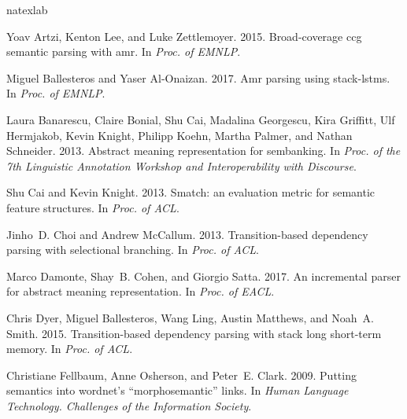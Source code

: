 \documentclass[11pt,a4paper]{article}
\begin{document}

\begin{thebibliography}{30}
	\expandafter\ifx\csname natexlab\endcsname\relax\def\natexlab#1{#1}\fi
	
	Yoav Artzi, Kenton Lee, and Luke Zettlemoyer. 2015.
	\newblock Broad-coverage ccg semantic parsing with amr.
	\newblock In \emph{Proc. of EMNLP}.
	
	Miguel Ballesteros and Yaser Al-Onaizan. 2017.
	\newblock Amr parsing using stack-lstms.
	\newblock In \emph{Proc. of EMNLP}.
	
	Laura Banarescu, Claire Bonial, Shu Cai, Madalina Georgescu, Kira Griffitt, Ulf
	Hermjakob, Kevin Knight, Philipp Koehn, Martha Palmer, and Nathan Schneider.
	2013.
	\newblock Abstract meaning representation for sembanking.
	\newblock In \emph{Proc. of the 7th Linguistic Annotation Workshop and
		Interoperability with Discourse}.
	
	Shu Cai and Kevin Knight. 2013.
	\newblock Smatch: an evaluation metric for semantic feature structures.
	\newblock In \emph{Proc. of ACL}.
	
	Jinho~D. Choi and Andrew McCallum. 2013.
	\newblock Transition-based dependency parsing with selectional branching.
	\newblock In \emph{Proc. of ACL}.
	
	Marco Damonte, Shay~B. Cohen, and Giorgio Satta. 2017.
	\newblock An incremental parser for abstract meaning representation.
	\newblock In \emph{Proc. of EACL}.
	
	Chris Dyer, Miguel Ballesteros, Wang Ling, Austin Matthews, and Noah~A. Smith.
	2015.
	\newblock Transition-based dependency parsing with stack long short-term
	memory.
	\newblock In \emph{Proc. of ACL}.
	
	Christiane Fellbaum, Anne Osherson, and Peter~E. Clark. 2009.
	\newblock Putting semantics into wordnet's ``morphosemantic'' links.
	\newblock In \emph{Human Language Technology. Challenges of the Information
		Society}.
	

\end{thebibliography}
\end{document}
